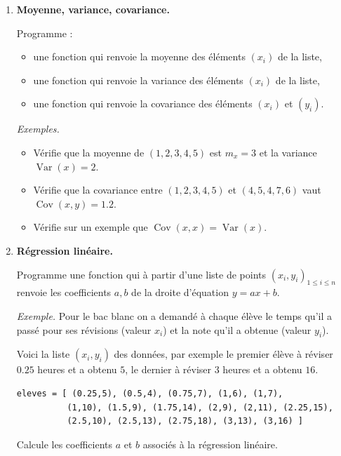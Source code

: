 \documentclass[11pt,class=report,crop=false]{standalone}
\begin{document}
\begin{activite}
	

\begin{enumerate}
	\item \textbf{Moyenne, variance, covariance.}
	
	Programme :
	\begin{itemize}
		\item une fonction  qui renvoie la moyenne des éléments $(x_i)$ de la liste,
		
		\item une fonction  qui renvoie la variance des éléments $(x_i)$ de la liste,
		
		\item une fonction  qui renvoie la covariance des éléments $(x_i)$ et $(y_i)$.
	\end{itemize}
	
	\emph{Exemples.}
	\begin{itemize}
		\item Vérifie que la moyenne de $(1,2,3,4,5)$ est $m_x = 3$ et la variance $\operatorname{Var}(x) = 2$.
		
		\item Vérifie que la covariance entre $(1,2,3,4,5)$ et $(4,5,4,7,6)$ vaut $\operatorname{Cov}(x,y) = 1.2$.
		
		\item Vérifie sur un exemple que $\operatorname{Cov}(x,x) = \operatorname{Var}(x)$.
	\end{itemize}	

	\item \textbf{Régression linéaire.}
	
	Programme une fonction  qui à partir d'une liste de points
	$(x_i,y_i)_{1\le i \le n}$ renvoie les coefficients $a,b$ de la droite d'équation $y = ax+b$.
	
	\emph{Exemple.}
	Pour le bac blanc on a demandé à chaque élève le temps qu'il a passé pour ses révisions (valeur $x_i$) et la note qu'il a obtenue (valeur $y_i$).
	
	Voici la liste $(x_i,y_i)$ des données, par exemple le premier élève à réviser $0.25$ heures et a obtenu $5$,
	le dernier à réviser $3$ heures et a obtenu $16$.
\begin{center}
\begin{minipage}{0.85\textwidth}	
\begin{lstlisting}		
eleves = [ (0.25,5), (0.5,4), (0.75,7), (1,6), (1,7),
          (1,10), (1.5,9), (1.75,14), (2,9), (2,11), (2.25,15),
          (2.5,10), (2.5,13), (2.75,18), (3,13), (3,16) ]
\end{lstlisting}
\end{minipage}
\end{center}
   Calcule les coefficients $a$ et $b$ associés à la régression linéaire.
	

\end{enumerate}
\end{activite}
\end{document}
